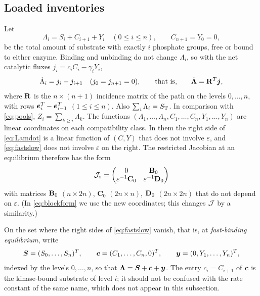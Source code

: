 \subsection{Loaded inventories}
Let
\begin{equation}\label{eq:loaded}
 \Lambda_i=S_i+C_{i+1}+Y_i\quad(0\le i\le n),\qquad C_{n+1}=Y_0=0,
\end{equation}
be the total amount of substrate with exactly \(i\) phosphate groups, free or bound to either
enzyme. Binding and unbinding do not change \(\Lambda_i\), so with the net catalytic fluxes
\(j_i=c_iC_i-\gamma_iY_i\),
\begin{equation}\label{eq:Lamdot}
 \dot\Lambda_i=j_i-j_{i+1}\quad(j_0=j_{n+1}=0),\qquad\text{that is,}\qquad
 \dot{\boldsymbol\Lambda}=\mathbf R^{T}\boldsymbol j,
\end{equation}
where \(\mathbf R\) is the \(n\times(n+1)\) incidence matrix of the path on the levels \(0,\dots,n\),
with rows \(\boldsymbol e_i^{T}-\boldsymbol e_{i-1}^{T}\) \((1\le i\le n)\). Also \(\sum_i\Lambda_i=S_{\mathrm T}\). In
comparison with \eqref{eq:pools}, \(Z_i=\sum_{k\ge i}\Lambda_k\). The functions
\((\Lambda_1,\dots,\Lambda_n,C_1,\dots,C_n,Y_1,\dots,Y_n)\) are linear coordinates on each
compatibility class. In them the right side of \eqref{eq:Lamdot} is a linear function of
\((C,Y)\) that does not involve \(\varepsilon\), and \eqref{eq:fastslow} does not involve
\(\varepsilon\) on the right. The restricted Jacobian at an equilibrium therefore has the form
\begin{equation}\label{eq:blockform}
 \mathcal J_\varepsilon=\begin{pmatrix}0&\mathbf B_0\\ \varepsilon^{-1}\mathbf C_0&\varepsilon^{-1}\mathbf D_0\end{pmatrix}
\end{equation}
with matrices \(\mathbf B_0\) \((n\times2n)\), \(\mathbf C_0\) \((2n\times n)\), \(\mathbf D_0\)
\((2n\times2n)\) that do not depend on \(\varepsilon\). (In \eqref{eq:blockform} we use the new
coordinates; this changes \(\mathcal J\) by a similarity.)

On the set where the right sides of \eqref{eq:fastslow} vanish, that is, at \emph{fast-binding
equilibrium}, write
\[
 \boldsymbol S=(S_0,\dots,S_n)^{T},\qquad \boldsymbol c=(C_1,\dots,C_n,0)^{T},\qquad \boldsymbol y=(0,Y_1,\dots,Y_n)^{T},
\]
indexed by the levels \(0,\dots,n\), so that \(\boldsymbol\Lambda=\boldsymbol S+\boldsymbol c+\boldsymbol y\). The entry \(c_i=C_{i+1}\)
of \(\boldsymbol c\) is the kinase-bound substrate of level \(i\); it should not be confused with the
rate constant of the same name, which does not appear in this subsection.

